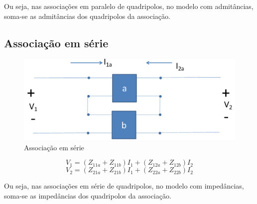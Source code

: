 \documentclass[a4paper, 12pt]{article}
\begin{document}
		Ou seja, nas associações em paralelo de quadripolos, no modelo com admitâncias, soma-se as admitâncias dos quadripolos da associação.
		
		\newpage
		\subsection{Associação em série}
		\begin{figure}[h]
			\centering
			\includegraphics[scale=0.4]{a11.png}
			\caption{Associação em série}
		\end{figure}
		\begin{equation}
			V_1 = (Z_{11a} + Z_{11b})I_1 + (Z_{12a} + Z_{12b})I_2
		\end{equation}
		\begin{equation}
			V_2 = (Z_{21a} + Z_{21b})I_1 + (Z_{22a} + Z_{22b})I_2
		\end{equation}
		
		Ou seja, nas associações em série de quadripolos, no modelo com impedâncias, soma-se as impedâncias dos quadripolos da associação.
\end{document}
